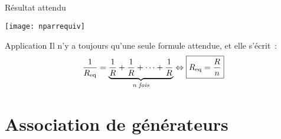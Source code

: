 \documentclass[a4paper, 12pt, final, garamond]{book}
\begin{document}
\subsection{}
\begin{tcbraster}[raster columns=2, raster equal height=rows]
    \begin{NCprop}{Résultat attendu}
        \begin{center}
            \texttt{[image: nparrequiv]}
        \end{center}
    \end{NCprop}
    \begin{NCexem}{Application}
        Il n'y a toujours qu'une seule formule attendue, et elle s'écrit~:
        \[ \frac{1}{R_{\rm eq}} = \underbrace{ \frac{1}{R} + \frac{1}{R} +
            \cdots + \frac{1}{R}}_{\textit{n fois}} \Leftrightarrow
        \boxed{R_{\rm eq} = \frac{R}{n}} \]
    \end{NCexem}
\end{tcbraster}

\section{Association de générateurs}
\end{document}
